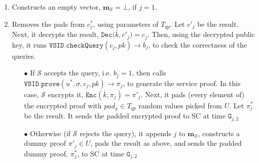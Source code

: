 \begin{enumerate}
\begin{enumerate}

\item Constructs an empty  vector, $\bm{m}_{\scriptscriptstyle\mathcal S}=\bot$, if $j=1$.  
\item Removes the pads from $c^{\scriptscriptstyle *}_{\scriptscriptstyle j}$, using  parameters of $T_{\scriptscriptstyle qp}$. Let  $c'_{\scriptscriptstyle j}$ be the result. Next, it  decrypts  the result, $\mathtt{Dec(}\bar{k},c'_{\scriptscriptstyle j})=c_{\scriptscriptstyle j}$. Then, using the decrypted public key, it   runs $\mathtt{VSID.checkQuery}(c_{\scriptscriptstyle j}, pk)\rightarrow b_{\scriptscriptstyle j}$, to check the correctness of the queries.





\begin{itemize}
\item[$\bullet$] If $\mathcal S$ accepts the query, i.e. $b_{\scriptscriptstyle j}=1$, then  calls $\mathtt{VSID.prove}(u^{\scriptscriptstyle *},\sigma,c_{\scriptscriptstyle j},pk)\rightarrow \pi_{\scriptscriptstyle j}$, to generate the service proof. In this case, $\mathcal S$ encrypts it, $\mathtt{Enc}(\bar{k},\pi_{\scriptscriptstyle j})=\pi'_{\scriptscriptstyle j}$. Next, it   pads (every element of) the encrypted proof with ${pad}_{\scriptscriptstyle \pi}\in T_{\scriptscriptstyle qp}$ random values  picked from $U$. Let $\pi^{\scriptscriptstyle *}_{\scriptscriptstyle j}$ be the result. It sends the padded encrypted proof  to SC at time $\texttt{G}_{\scriptscriptstyle j,2}$ 

\item[$\bullet$] Otherwise (if $\mathcal S$ rejects the query), it appends  $j$  to $\bm{m}_{\scriptscriptstyle\mathcal{S}}$,  constructs a dummy proof $\pi'_{\scriptscriptstyle j}\in U$,  pads the result as above, and sends the padded dummy proof, $\pi^{\scriptscriptstyle *}_{\scriptscriptstyle j}$, to SC at time $\texttt{G}_{\scriptscriptstyle j,2}$ %


\end{itemize}
\end{enumerate}
\end{enumerate}

